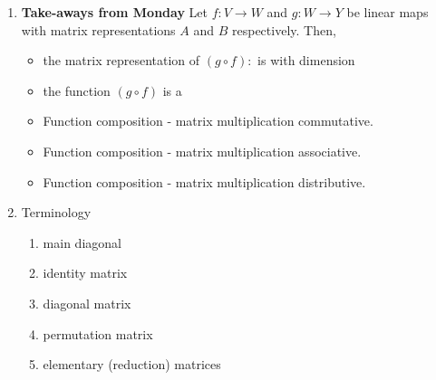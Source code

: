 \documentclass[11pt,fleqn]{article}
\begin{document}
\renewcommand{\headrulewidth}{0pt}
\newcommand{\blank}[1]{\rule{#1}{0.75pt}}
\renewcommand{\d}{\displaystyle}

\newcommand{\bpm}{\begin{pmatrix}}
\newcommand{\epm}{\end{pmatrix}}
\newcommand{\bbm}{\begin{bmatrix}}
\newcommand{\ebm}{\end{bmatrix}}

\vspace*{-0.7in}

\begin{center}
  \large {}
\end{center}

\begin{enumerate}
\item \textbf{Take-aways from Monday} Let $f: V \to W$ and $g:W \to Y$ be linear maps with matrix representations $A$ and $B$ respectively. Then, \\
\begin{itemize}
\item the matrix representation of $(g \circ f):$\underline{\hspace{1in}} is \underline{\hspace{1in}} with dimension \underline{\hspace{1in}}\\
\item the function $(g \circ f)$ is a \\
\item Function composition - matrix multiplication \underline{\hspace{1in}} commutative.\\
\item Function composition - matrix multiplication \underline{\hspace{1in}} associative.\\
\vspace{1in}
\item Function composition - matrix multiplication \underline{\hspace{1in}} distributive.\\
\vspace{1in}
\end{itemize}
\item Terminology
	\begin{enumerate}
	\item main diagonal
	\vfill
	\item identity matrix
	\vfill
	\newpage
	\item diagonal matrix
	\vfill
	\item permutation matrix
	\vfill
	\item elementary (reduction) matrices
	\vfill
	\end{enumerate}
\end{enumerate}
\end{document}
